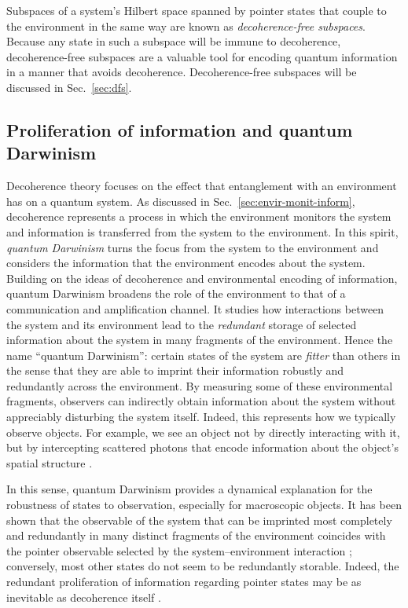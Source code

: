 \documentclass[3p,sort&compress,12pt]{elsarticle}
\begin{document}
Subspaces of a system's Hilbert space spanned by pointer states that couple to the environment in the same way are known as \emph{decoherence-free subspaces}. Because any state in such a subspace will be immune to decoherence, decoherence-free subspaces are a valuable tool for encoding quantum information in a manner that avoids decoherence. Decoherence-free subspaces will be discussed in Sec.~\ref{sec:dfs}.

\subsection{\label{sec:prol-inform-quant}Proliferation of information and quantum Darwinism}

Decoherence theory focuses on the effect that entanglement with an environment has on a quantum system. As discussed in Sec.~\ref{sec:envir-monit-inform}, decoherence represents a process in which the environment monitors the system and information is transferred from the system to the environment. In this spirit, \emph{quantum Darwinism} \cite{Zurek:2003:pl,Ollivier:2003:za,Ollivier:2004:im,Blume:2004:oo,Blume:2005:oo,Zurek:2009:om,Riedel:2010:un,Riedel:2011:un,Riedel:2012:un,Zurek:2014:xx, Zwolak:2016:zz,Zwolak:2017:mm,Zurek:2018:on,Unden:2018:ia} turns the focus from the system to the environment and considers the information that the environment encodes about the system. Building on the ideas of decoherence and environmental encoding of information, quantum Darwinism broadens the role of the environment to that of a communication and amplification channel. It studies how interactions between the system and its environment lead to the \emph{redundant} storage of selected information about the system in many fragments of the environment. Hence the name ``quantum Darwinism'': certain states of the system are \emph{fitter} than others in the sense that they are able to imprint their information robustly and redundantly across the environment.  By measuring some of these environmental fragments, observers can indirectly obtain information about the system without appreciably disturbing the system itself. Indeed, this represents how we typically observe objects. For example, we see an object not by directly interacting with it, but by intercepting scattered photons that encode information about the object's spatial structure \cite{Riedel:2010:un,Riedel:2011:un}. 

In this sense, quantum Darwinism provides a dynamical explanation for the robustness of states to observation, especially for macroscopic objects. It has been shown that the observable of the system that can be imprinted most completely and redundantly in many distinct fragments of the environment coincides with the pointer observable selected by the system--environment interaction  \cite{Ollivier:2003:za,Ollivier:2004:im,Blume:2004:oo,Blume:2005:oo}; conversely, most other states do not seem to be redundantly storable. Indeed, the redundant proliferation of information regarding pointer states may be as inevitable as decoherence itself \cite{Zwolak:2014:tt}. 
\end{document}
